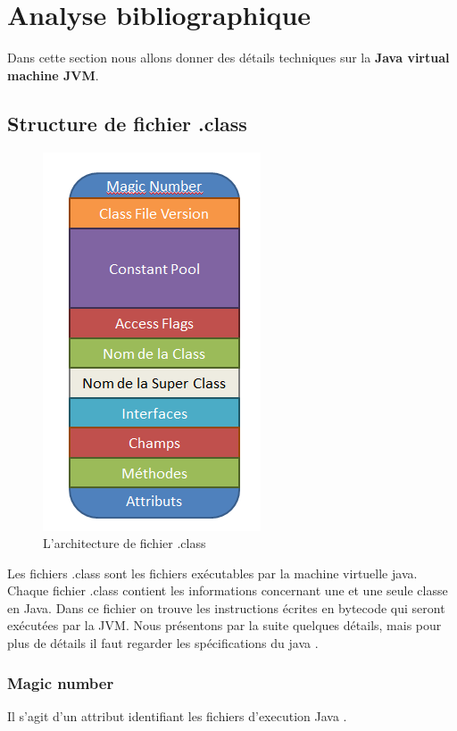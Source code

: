 \documentclass[12pt, a4paper, one side]{article}
\begin{document}
    \newpage
    \section{Analyse bibliographique}
    Dans cette section nous allons donner des détails techniques sur la  \textbf{Java virtual machine JVM}.

    \subsection{Structure de fichier .class}

    \begin{figure}[h]
        \centering
        \includegraphics[scale=0.80]{JavaInternal.png}
        \caption{L'architecture de fichier .class \cite{ref_DexFormatvsJavabytecode}}
        \label{fig1}
    \end{figure}


    Les fichiers .class sont les fichiers exécutables par la machine virtuelle java. Chaque fichier .class contient les informations concernant une et une seule classe en Java. Dans ce fichier on trouve les instructions écrites en bytecode qui seront exécutées par la JVM. Nous présentons par la suite quelques détails, mais pour plus de détails il faut regarder les spécifications du java \cite{ref_specifications_java} .

    \subsubsection{Magic number}
    Il s'agit d'un attribut identifiant les fichiers d'execution Java \cite{ref_DexFormatvsJavabytecode}.
\end{document}
